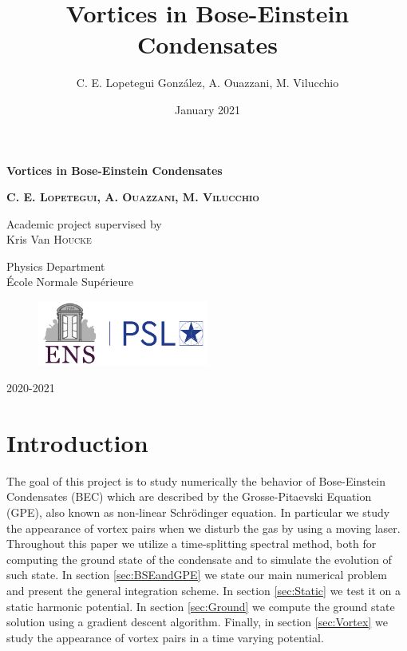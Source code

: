 \documentclass{article}
\title{Vortices in Bose-Einstein Condensates}
\author{C. E. Lopetegui González, A. Ouazzani, M. Vilucchio}
\date{January 2021}
\begin{document}
\begin{titlepage}
    \begin{center}
        \vspace*{1cm}
            
        \Huge
        \textbf{Vortices in Bose-Einstein Condensates}
            
        \vspace{1.5cm}
        
        \Large    
        \textbf{C. E. \textsc{Lopetegui}, A. \textsc{Ouazzani}, M. \textsc{Vilucchio}}
            
        \vspace{1.5cm}
        
        \large  
        Academic project supervised by\\
        Kris Van \textsc{Houcke}
        
            
        \vfill
            
            
        \large
        Physics Department\\
        École Normale Supérieure\\
        
        \begin{figure}[!ht]
        \centering
        \includegraphics[width=0.5\textwidth]{logo.png}
        \end{figure}
        
        \vspace{0.5cm}
        2020-2021            
    \end{center}
\end{titlepage}


\newpage

\tableofcontents


\newpage

\section*{Introduction}\label{sec:Intro}
The goal of this project is to study numerically the behavior of Bose-Einstein Condensates (BEC) which are described by the Grosse-Pitaevski Equation (GPE), also known as non-linear Schrödinger equation. In particular we study the appearance of vortex pairs when we disturb the gas by using a moving laser. Throughout this paper we utilize a time-splitting spectral method, both for computing the ground state of the condensate and to simulate the evolution of such state. In section \ref{sec:BSEandGPE} we state our main numerical problem and present the general integration scheme. In section \ref{sec:Static} we test it on a static harmonic potential. In section \ref{sec:Ground} we compute the ground state solution using a gradient descent algorithm. Finally, in section \ref{sec:Vortex} we study the appearance of vortex pairs in a time varying potential.
\end{document}
